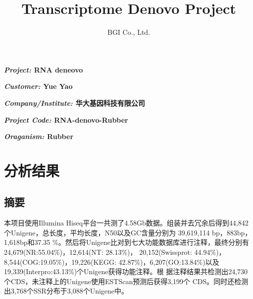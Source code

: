 \documentclass[10pt,oneside,a4paper]{article}	%
\begin{document}
\title{\huge \textbf{Transcriptome Denovo Project}}
\author{BGI Co., Ltd.}
\maketitle
\vspace{75 mm}	%
\textbf{\textit{\large{Project: }}\large{RNA deneovo}}\par
\vspace{5 mm}
\textbf{\textit{\large{Customer: }}\large{Yue Yao}}\par
\vspace{5 mm}
\textbf{\textit{\large{Company/Institute: }}\large{华大基因科技有限公司}}\par
\vspace{5 mm}
\textbf{\textit{\large{Project Code: }}\large{RNA-denovo-Rubber}}\par
\vspace{5 mm}
\textbf{\textit{\large{Oraganism: }}\large{Rubber}}\par

\newpage
\tableofcontents	%
\newpage


\section{分析结果}
\subsection{摘要}
本项目使用Illumina Hiseq平台一共测了4.58Gb数据。组装并去冗余后得到44,842个Unigene，总长度，平均长度，N50以及GC含量分别为 39,619,114
bp，883bp，1,618bp和37.35 \%。然后将Unigene比对到七大功能数据库进行注释，最终分别有24,679(NR:55.04\%)，12,614(NT: 28.13\%)，
20,152(Swissprot: 44.94\%)，8,544(COG:19.05\%)，19,226(KEGG: 42.87\%)，6,207(GO:13.84\%)以及19,339(Interpro:43.13\%)个Unigene获得功能注释。根
据注释结果共检测出24,730个CDS，未注释上的Unigene使用ESTScan预测后获得3,199个 CDS。同时还检测出3,768个SSR分布于3,088个Unigene中。\par
\end{document}
